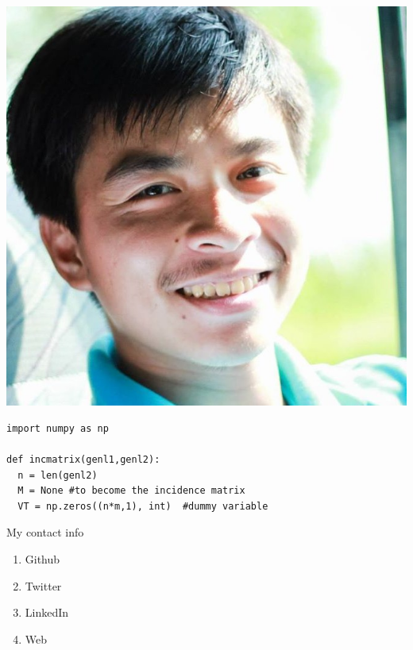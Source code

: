 \documentclass[a4paper]{article}
\begin{document}
  \noindent
  \begin{minipage}[t]{0.2\textwidth}
    \vspace{0pt}
    \begin{flushleft}	
    \includegraphics[width=\textwidth]{avatar}
    \end{flushleft}
  \end{minipage}
  \hspace{10pt}
  \begin{minipage}[t]{0.5\textwidth}
    \vspace{3pt}
    \begin{verbatim}
import numpy as np

def incmatrix(genl1,genl2):
  n = len(genl2)
  M = None #to become the incidence matrix
  VT = np.zeros((n*m,1), int)  #dummy variable
     \end{verbatim}
  \end{minipage}
  \hspace{10pt}
  \begin{minipage}[t]{0.2\textwidth}
    \vspace{0pt}
    My contact info
    \begin{enumerate}
      \item Github
      \item Twitter
      \item LinkedIn
      \item Web
    \end{enumerate}
  \end{minipage}
\end{document}
